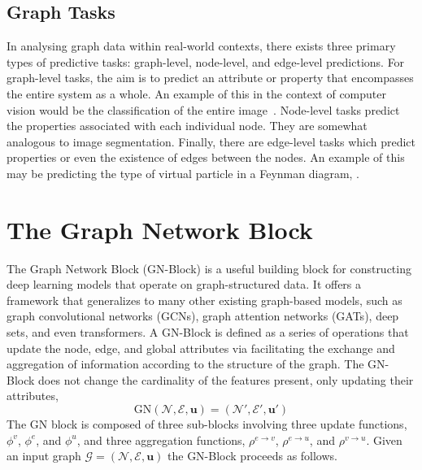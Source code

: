 \subsection{Graph Tasks}

In analysing graph data within real-world contexts, there exists three primary types of predictive tasks: graph-level, node-level, and edge-level predictions.
For graph-level tasks, the aim is to predict an attribute or property that encompasses the entire system as a whole.
An example of this in the context of computer vision would be the classification of the entire image~.
Node-level tasks predict the properties associated with each individual node.
They are somewhat analogous to image segmentation.
Finally, there are edge-level tasks which predict  properties or even the existence of edges between the nodes.
An example of this may be predicting the type of virtual particle in a Feynman diagram, .

\section{The Graph Network Block}
\label{sec:gn_block}

The Graph Network Block (GN-Block) is a useful building block for constructing deep learning models that operate on graph-structured data.
It offers a framework that generalizes to many other existing graph-based models, such as graph convolutional networks (GCNs), graph attention networks (GATs), deep sets, and even transformers.
A GN-Block is defined as a series of operations that update the node, edge, and global attributes via facilitating the exchange and aggregation of information according to the structure of the graph.
The GN-Block does not change the cardinality of the features present, only updating their attributes,
\begin{equation}
    \text{GN}(\mathcal{N}, \mathcal{E}, \mathbf{u}) = (\mathcal{N}', \mathcal{E}', \mathbf{u}')
\end{equation}
The GN block is composed of three sub-blocks involving three update functions, $\phi^v$, $\phi^e$, and $\phi^u$, and three aggregation functions, $\rho^{e \to v}$, $\rho^{e \to u}$, and $\rho^{v \to u}$.
Given an input graph $\mathcal{G} = (\mathcal{N}, \mathcal{E}, \mathbf{u})$ the GN-Block proceeds as follows.

